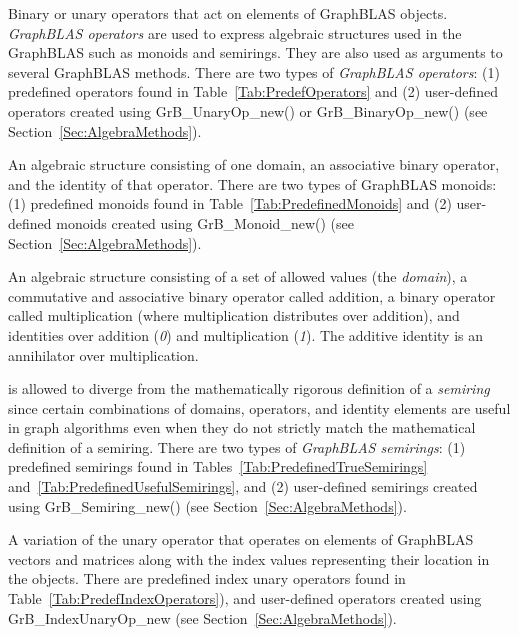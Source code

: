  Binary or unary operators that act on elements of GraphBLAS 
objects.  \emph{GraphBLAS operators} are used to express algebraic structures used in the 
GraphBLAS such as monoids and semirings. They are also used as arguments to several
GraphBLAS methods. There are two types of \emph{GraphBLAS operators}: 
(1) predefined operators found in Table~\ref{Tab:PredefOperators} and (2) user-defined 
operators created using {\sf GrB\_UnaryOp\_new()} or {\sf GrB\_BinaryOp\_new()} 
(see Section~\ref{Sec:AlgebraMethods}).

 An algebraic structure consisting of one domain, an associative 
binary operator, and the identity of that operator.  There are two types 
of GraphBLAS monoids: (1) predefined monoids found in 
Table~\ref{Tab:PredefinedMonoids} and (2) user-defined monoids created using 
{\sf GrB\_Monoid\_new()} (see Section~\ref{Sec:AlgebraMethods}). 

 An algebraic structure consisting of a set of allowed values
(the \emph{domain}), a commutative and associative binary operator called addition, a binary operator 
called multiplication (where multiplication distributes over addition),
and identities over addition (\emph{0}) and multiplication (\emph{1}).  The additive
identity is an annihilator over multiplication.   

 is allowed to diverge from the mathematically 
rigorous definition of a \emph{semiring} since certain combinations of domains, operators, and identity 
elements are useful in graph algorithms even when they do not strictly match the mathematical
definition of a semiring.
There are two types 
of \emph{GraphBLAS semirings}: (1) predefined semirings found in 
Tables~\ref{Tab:PredefinedTrueSemirings} and~\ref{Tab:PredefinedUsefulSemirings}, and (2) user-defined semirings created using 
{\sf GrB\_Semiring\_new()} (see Section~\ref{Sec:AlgebraMethods}).

 A variation of the unary operator that operates
on elements of GraphBLAS vectors and matrices along with the index values 
representing their location in the objects.  There are predefined index unary
operators found in Table~\ref{Tab:PredefIndexOperators}), and user-defined
operators created using {\sf GrB\_IndexUnaryOp\_new} (see Section~\ref{Sec:AlgebraMethods}).
\glossEnd


